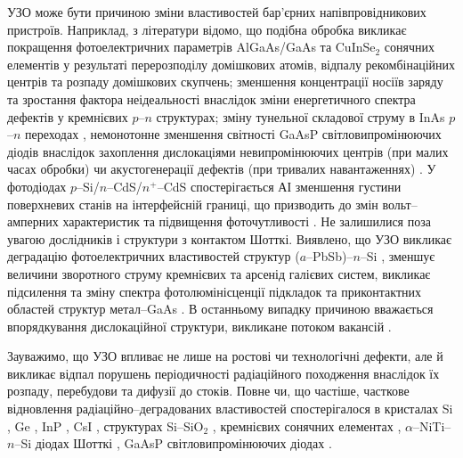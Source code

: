 УЗО може бути причиною зміни властивостей бар'єрних напівпровідникових пристроїв.
Наприклад, з літератури відомо, що подібна обробка викликає покращення фотоелектричних параметрів AlGaAs/GaAs \cite{Zaver2005} та CuInSe$_2$ \cite{OstapSC} сонячних елементів у результаті перерозподілу домішкових атомів, відпалу рекомбінаційних центрів та розпаду домішкових скупчень;
зменшення концентрації носіїв заряду \cite{Davletova2008}
та зростання фактора неідеальності \cite{Davletova2009}
внаслідок зміни енергетичного спектра дефектів у кремнієвих $p$--$n$ структурах;
зміну тунельної складової струму в InAs $p$--$n$ переходах \cite{Teterkin2009r},
немонотонне зменшення світності GaAsP світловипромінюючих діодів внаслідок захоплення дислокаціями невипромінюючих центрів (при малих часах обробки) чи акустогенерації дефектів (при тривалих навантаженнях) \cite{US:LED}.
У фотодіодах $p$--Si/$n$--CdS/$n^+$--CdS спостерігається АІ зменшення густини поверхневих станів на інтерфейсній границі,
що призводить до змін вольт--амперних характеристик та підвищення фоточутливості \cite{Mirsagatov,Mirsagatov2}.
Не залишилися поза увагою дослідників і структури з контактом Шотткі.
Виявлено, що УЗО викликає деградацію фотоелектричних властивостей структур ($a$--PbSb)--$n$--Si \cite{Pashaev2012r,PashOJA},
зменшує величини зворотного струму кремнієвих \cite{Tagaev} та арсенід галієвих \cite{UST:SDErmol} систем,
викликає підсилення та зміну спектра фотолюмінісценції підкладок та приконтактних областей структур метал--GaAs \cite{UST:SDErmol}.
В останньому випадку причиною вважається впорядкування дислокаційної структури, викликане потоком вакансій \cite{UST:SDErmol}.

Зауважимо, що УЗО впливає не лише на ростові чи технологічні дефекти, але й викликає відпал порушень періодичності радіаційного походження внаслідок їх розпаду, перебудови та дифузії до стоків.
Повне чи, що частіше, часткове відновлення радіаційно--деградованих властивостей спостерігалося
в кристалах Si  \cite{OstrovRadSi,Podolian2012r,PodolHivr,YOlikh2006TPLr}, Ge \cite{Olikh:FTP1996},
InP \cite{OlikhProc}, CsI \cite{UST:OstrovCsI}, структурах Si--SiO$_2$ \cite{Parchinskii2000r,Parchinskii2006r},
кремнієвих сонячних елементах \cite{YOlikh2007TPLr},
$\alpha$--NiTi--$n$--Si діодах Шотткі \cite{Pashaev2014r},
GaAsP світловипромінюючих діодах \cite{US:LED,UST:LED_SM}.



